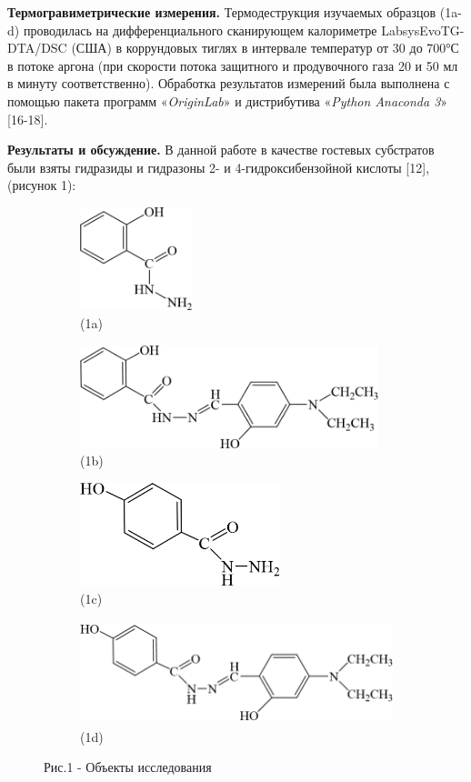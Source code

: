 \begin{multicols}{2}
{\bfseries Термогравиметрические измерения.} Термодеструкция изучаемых
образцов (1a-d) проводилась на дифференциального сканирующем калориметре
LabsysEvoTG-DTA/DSC (США) в коррундовых тиглях в интервале температур от
30 до 700°С в потоке аргона (при скорости потока защитного и
продувочного газа 20 и 50 мл в минуту соответственно). Обработка
результатов измерений была выполнена с помощью пакета программ
«\emph{OriginLab}» и дистрибутива «\emph{Python Anaconda 3}»
{[}16-18{]}.

{\bfseries Результаты и обсуждение.} В данной работе в качестве гостевых
субстратов были взяты гидразиды и гидразоны 2- и 4-гидроксибензойной
кислоты {[}12{]}, (рисунок 1):
\end{multicols}



\begin{figure}[H]
	\centering
	\begin{subfigure}{0.38\textwidth}
		\centering
		\includegraphics[height=3cm]{media/chem4/image3}
        \caption*{(1a)}
	\end{subfigure}
	\begin{subfigure}{0.58\textwidth}
		\centering
		\includegraphics[height=3cm]{media/chem4/image4}
        \caption*{(1b)}
	\end{subfigure}
	
	\begin{subfigure}{0.38\textwidth}
		\centering
		\includegraphics[height=3cm]{media/chem4/image5}
        \caption*{(1c)}
	\end{subfigure}
	\begin{subfigure}{0.58\textwidth}
		\centering
		\includegraphics[height=3cm]{media/chem4/image6}
        \caption*{(1d)}
	\end{subfigure}
	\caption*{Рис.1 - Объекты исследования}
\end{figure}


